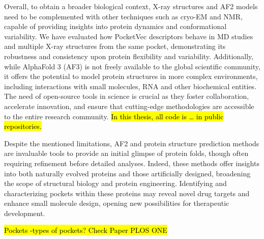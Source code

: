 Overall, to obtain a broader biological context, X-ray structures and AF2 models need to be complemented with other techniques such as cryo-EM and NMR, capable of providing insights into protein dynamics and conformational variability. We have evaluated how PocketVec descriptors behave in MD studies and multiple X-ray structures from the same pocket, demonstrating its robustness and consistency upon protein flexibility and variability. Additionally, while AlphaFold 3 (AF3) is not freely available to the global scientific community, it offers the potential to model protein structures in more complex environments, including interactions with small molecules, RNA and other biochemical entities\cite{abramson_accurate_2024}. The need of open-source tools in science is crucial as they foster collaboration, accelerate innovation, and ensure that cutting-edge methodologies are accessible to the entire research community. \hl{In this thesis, all code is … in public repositories. }

Despite the mentioned limitations, AF2 and protein structure prediction methods are invaluable tools to provide an initial glimpse of protein folds, though often requiring refinement before detailed analyses\cite{zhang_benchmarking_2023, holcomb_evaluation_2023, scardino_how_2023}. Indeed, these methods offer insights into both naturally evolved proteins and those artificially designed, broadening the scope of structural biology and protein engineering. Identifying and characterizing pockets within these proteins may reveal novel drug targets and enhance small molecule design, opening new possibilities for therapeutic development.

\hl{Pockets -types of pockets? Check Paper PLOS ONE }